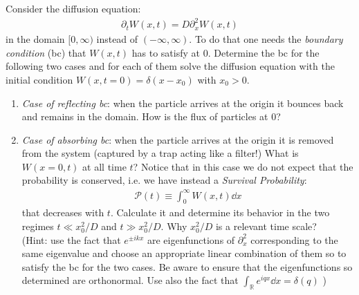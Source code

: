 \documentclass[../template.tex]{subfiles}
\begin{document}
\begin{exo}
    Consider the diffusion equation:
    \begin{align*}
        \partial_t W(x,t) = D \partial_x^2 W(x,t)
    \end{align*}
    in the domain $[0,\infty)$ instead of $(-\infty,\infty)$. To do that one needs the \textit{boundary condition} (bc) that $W(x,t)$ has to satisfy at $0$. Determine the bc for the following two cases and for each of them solve the diffusion equation with the initial condition $W(x,t=0) = \delta(x-x_0 )$ with $x_0 > 0$.
    \begin{enumerate}
        \item \textit{Case of reflecting bc}: when the particle arrives at the origin it bounces back and remains in the domain. How is the flux of particles at $0$?
        \item \textit{Case of absorbing bc}: when the particle arrives at the origin it is removed from the system (captured by a trap acting like a filter!) What is $W(x=0, t)$ at all time $t$? Notice that in this case we do not expect that the probability is conserved, i.e. we have instead a \textit{Survival Probability}:
        \begin{align*}
            \mathcal{P}(t) \equiv \int_0^\infty W(x,t) \dd{x}    
        \end{align*}      
        that decreases with $t$. Calculate it and determine its behavior in the two regimes $t \ll x_0^2/D$ and $t \gg x_0^2/D$. Why $x_0^2/D$ is a relevant time scale?\\
        (Hint: use the fact that $e^{\pm ikx}$ are eigenfunctions of $\partial_x^2$ corresponding to the same eigenvalue and choose an appropriate linear combination of them so to satisfy the bc for the two cases. Be aware to ensure that the eigenfunctions so determined are orthonormal. Use also the fact that $\int_{\mathbb{R}} e^{iqx} \dd{x} = \delta(q)$  )
    \end{enumerate}
           
\end{exo}

\listoftheorems
\end{document}
